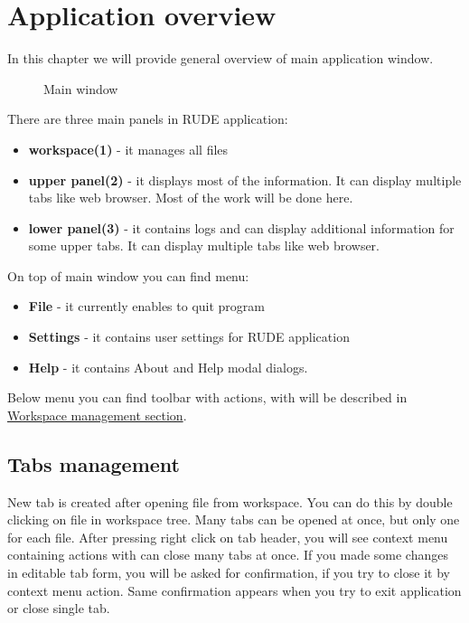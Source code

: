 \section{Application overview}\label{section:overview}

In this chapter we will provide general overview of main application window.

\begin{figure*}[!ht] 
	\centering
	\caption{Main window}
\end{figure*}

There are three main panels in RUDE application:
\begin{itemize}
	\item \textbf{workspace(1)} - it manages all files
	\item \textbf{upper panel(2)} - it displays most of the information. It can display multiple tabs like web browser. Most of the work will be done here.
	\item \textbf{lower panel(3)} - it contains logs and can display additional information for some upper tabs. It can display multiple tabs like web browser.
\end{itemize}

On top of main window you can find menu:
\begin{itemize}
	\item \textbf{File} - it currently enables to quit program
	\item \textbf{Settings} - it contains user settings for RUDE application
	\item \textbf{Help} - it contains About and Help modal dialogs.
\end{itemize}

Below menu you can find toolbar with actions, with will be described in \hyperref[section:workspace]{Workspace management section}.


\subsection{Tabs management}\label{sub:overview-tab}
New tab is created after opening file from workspace. You can do this by double clicking on file in workspace tree. Many tabs can be opened at once, but only one for each file. After pressing right click on tab header, you will see context menu containing actions with can close many tabs at once. If you made some changes in editable tab form, you will be asked for confirmation, if you try to close it by context menu action. Same confirmation appears when you try to exit application or close single tab.

